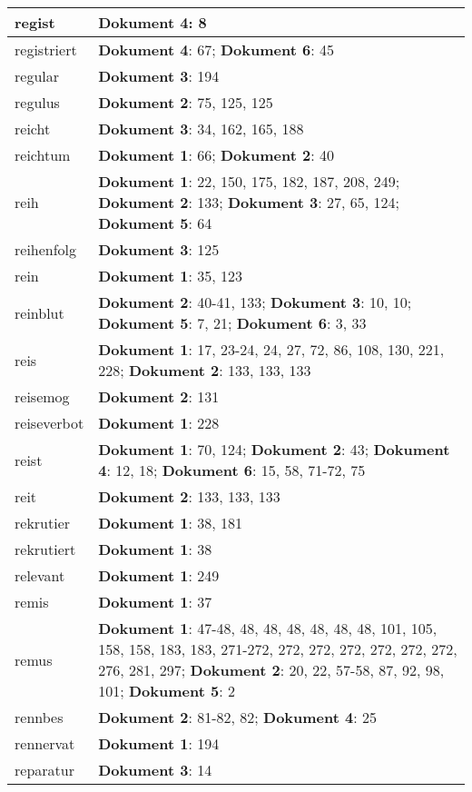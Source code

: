 \documentclass[a5paper]{article}
\begin{document}
\begin{longtable}[l]{|l|p{3in}|}
\hline
regist & \textbf{Dokument 4}: 8 \\
\hline
registriert & \textbf{Dokument 4}: 67; \textbf{Dokument 6}: 45 \\
\hline
regular & \textbf{Dokument 3}: 194 \\
\hline
regulus & \textbf{Dokument 2}: 75, 125, 125 \\
\hline
reicht & \textbf{Dokument 3}: 34, 162, 165, 188 \\
\hline
reichtum & \textbf{Dokument 1}: 66; \textbf{Dokument 2}: 40 \\
\hline
reih & \textbf{Dokument 1}: 22, 150, 175, 182, 187, 208, 249; \textbf{Dokument 2}: 133; \textbf{Dokument 3}: 27, 65, 124; \textbf{Dokument 5}: 64 \\
\hline
reihenfolg & \textbf{Dokument 3}: 125 \\
\hline
rein & \textbf{Dokument 1}: 35, 123 \\
\hline
reinblut & \textbf{Dokument 2}: 40-41, 133; \textbf{Dokument 3}: 10, 10; \textbf{Dokument 5}: 7, 21; \textbf{Dokument 6}: 3, 33 \\
\hline
reis & \textbf{Dokument 1}: 17, 23-24, 24, 27, 72, 86, 108, 130, 221, 228; \textbf{Dokument 2}: 133, 133, 133 \\
\hline
reisemog & \textbf{Dokument 2}: 131 \\
\hline
reiseverbot & \textbf{Dokument 1}: 228 \\
\hline
reist & \textbf{Dokument 1}: 70, 124; \textbf{Dokument 2}: 43; \textbf{Dokument 4}: 12, 18; \textbf{Dokument 6}: 15, 58, 71-72, 75 \\
\hline
reit & \textbf{Dokument 2}: 133, 133, 133 \\
\hline
rekrutier & \textbf{Dokument 1}: 38, 181 \\
\hline
rekrutiert & \textbf{Dokument 1}: 38 \\
\hline
relevant & \textbf{Dokument 1}: 249 \\
\hline
remis & \textbf{Dokument 1}: 37 \\
\hline
remus & \textbf{Dokument 1}: 47-48, 48, 48, 48, 48, 48, 48, 101, 105, 158, 158, 183, 183, 271-272, 272, 272, 272, 272, 272, 272, 276, 281, 297; \textbf{Dokument 2}: 20, 22, 57-58, 87, 92, 98, 101; \textbf{Dokument 5}: 2 \\
\hline
rennbes & \textbf{Dokument 2}: 81-82, 82; \textbf{Dokument 4}: 25 \\
\hline
rennervat & \textbf{Dokument 1}: 194 \\
\hline
reparatur & \textbf{Dokument 3}: 14 \\

\end{longtable}
\end{document}
